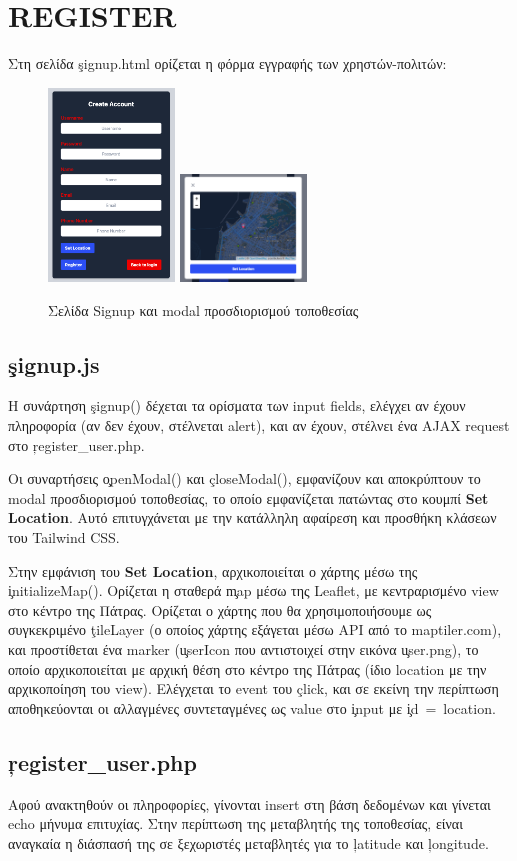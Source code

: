 \section{REGISTER}
    Στη σελίδα \c{signup.html} ορίζεται η φόρμα εγγραφής των χρηστών-πολιτών:

    \begin{figure}[H] \noindent \centering
        \includegraphics[width=0.3\textwidth]{img/register}
        \includegraphics[width=0.3\textwidth]{img/register-location}
        \caption{Σελίδα Signup και modal προσδιορισμού τοποθεσίας}
    \end{figure}

    \subsection{\c{signup.js}}
        Η συνάρτηση \c{signup()} δέχεται τα ορίσματα των input fields, ελέγχει αν έχουν πληροφορία (αν δεν έχουν, στέλνεται alert),
            και αν έχουν, στέλνει ένα AJAX request στο \c{register\_user.php}.

        Οι συναρτήσεις \c{openModal()} και \c{closeModal()}, εμφανίζουν και αποκρύπτουν το modal προσδιορισμού τοποθεσίας,
            το οποίο εμφανίζεται πατώντας στο κουμπί \textbf{Set Location}.
        Αυτό επιτυγχάνεται με την κατάλληλη αφαίρεση και προσθήκη κλάσεων του Tailwind CSS.

        Στην εμφάνιση του \textbf{Set Location}, αρχικοποιείται ο χάρτης μέσω της \c{initializeMap()}.
        Ορίζεται η σταθερά \c{map} μέσω της Leaflet, με κεντραρισμένο view στο κέντρο της Πάτρας.
        Ορίζεται ο χάρτης που θα χρησιμοποιήσουμε ως συγκεκριμένο \c{tileLayer} (ο οποίος χάρτης εξάγεται μέσω API από το maptiler.com),
            και προστίθεται ένα marker (\c{userIcon} που αντιστοιχεί στην εικόνα \c{user.png}), το οποίο αρχικοποιείται με αρχική θέση στο κέντρο της Πάτρας (ίδιο location με την αρχικοποίηση του view).
        Ελέγχεται το event του \c{click}, και σε εκείνη την περίπτωση αποθηκεύονται οι αλλαγμένες συντεταγμένες ως value στο \c{input} με \mbox{\c{id = location}}.

    \subsection{\c{register\_user.php}}
        Αφού ανακτηθούν οι πληροφορίες, γίνονται insert στη βάση δεδομένων και γίνεται echo μήνυμα επιτυχίας.
        Στην περίπτωση της μεταβλητής της τοποθεσίας, είναι αναγκαία η διάσπασή της σε ξεχωριστές μεταβλητές για το \c{latitude} και \c{longitude}.

